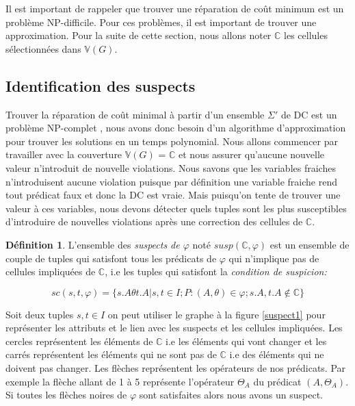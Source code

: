 \documentclass[letterpaper, 12pt]{report}
\theoremstyle{definition}
\newtheorem{mydef}{Définition}
\begin{document}
Il est important de rappeler que trouver une réparation de coût minimum est un problème NP-difficile. Pour ces problèmes, il est important de trouver une approximation. Pour la suite de cette section, nous allons noter $\mathbb{C}$ les cellules sélectionnées dans $\mathbb{V}(G)$.

\subsection{Identification des suspects}

Trouver la réparation de coût minimal à partir d'un ensemble $\Sigma'$ de DC est un problème NP-complet \cite{main}, nous avons donc besoin d'un algorithme d'approximation pour trouver les solutions en un temps polynomial. Nous allons commencer par travailler avec la couverture $\mathbb{V}(G)$ = $\mathbb{C}$ et nous assurer qu'aucune nouvelle valeur n'introduit de nouvelle violations. Nous savons que les variables fraiches n'introduisent aucune violation puisque par définition une variable fraiche rend tout prédicat faux et donc la DC est vraie. Mais puisqu'on tente de trouver une valeur à ces variables, nous devons détecter quels tuples sont les plus susceptibles d'introduire de nouvelles violations après une correction des cellules de $\mathbb{C}$.

\begin{mydef}
	L'ensemble des \emph{suspects de $\varphi$} noté $susp( \mathbb{C}, \varphi)$ est un ensemble de couple de tuples qui satisfont tous les prédicats de $\varphi$ qui n'implique pas de cellules impliquées de $\mathbb{C}$, i.e les tuples qui satisfont la \emph{condition de suspicion:}

	$$ sc(s,t,\varphi) = \{ s.A \theta t.A | s,t \in I ; P:(A,\theta) \in \varphi ; s.A,t.A \not\in \mathbb{C} \}  $$
	 
\end{mydef}

Soit deux tuples $s,t \in I$ on peut utiliser le graphe à la figure \ref{suspect1} pour représenter les attributs et le lien avec les suspects et les cellules impliquées. Les cercles représentent les éléments de $\mathbb{C}$ i.e les éléments qui vont changer et les carrés représentent les éléments qui ne sont pas de $\mathbb{C}$ i.e des éléments qui ne doivent pas changer. Les flèches représentent les opérateurs de nos prédicats. Par exemple la flèche allant de 1 à 5 représente l'opérateur $\Theta_A$ du prédicat $(A,\Theta_A)$. Si toutes les flèches noires de $\varphi$ sont satisfaites alors nous avons un suspect.
\end{document}
